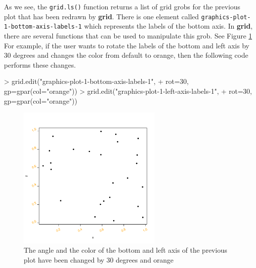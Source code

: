 \documentclass[11pt]{report}
\begin{document}
As we see, the \texttt{grid.ls()} function returns a list of grid grobs for the previous plot that has been redrawn by \textbf{grid}. There is one element called \texttt{graphics-plot-1-bottom-axis-labels-1} which represents the labels of the bottom axis. In \textbf{grid}, there are several functions that can be used to manipulate this grob. See Figure \ref{figure_1.2} \\

For example, if the user wants to rotate the labels of the bottom and left axis by 30 degrees and changes the color from default to orange, then the following code performs these changes.
\begin{Schunk}
\begin{Sinput}
> grid.edit("graphics-plot-1-bottom-axis-labels-1", 
+           rot=30, gp=gpar(col="orange"))
> grid.edit("graphics-plot-1-left-axis-labels-1", 
+           rot=30, gp=gpar(col="orange"))
\end{Sinput}
\end{Schunk}

\begin{figure}[h]
	\begin{center}
		\includegraphics[height = 7cm, width = 7cm]{figure/report_basic_demo_4.pdf}
		\caption{The angle and the color of the bottom and left axis of the previous plot have been changed by 30 degrees and orange}
		\label{figure_1.2}
	\end{center}
\end{figure}

\newpage
\end{document}
